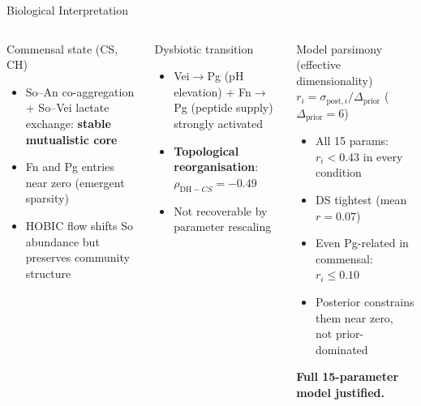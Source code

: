\documentclass[aspectratio=169,10pt]{beamer}
\begin{document}
\begin{frame}[t]{Biological Interpretation}
  \small
  \begin{columns}[T]
      \begin{block}{Commensal state (CS, CH)}
        \begin{itemize}
          \item So--An co-aggregation + So--Vei lactate exchange: \textbf{stable mutualistic core}
          \item Fn and Pg entries near zero (emergent sparsity)
          \item HOBIC flow shifts So abundance but preserves community structure
        \end{itemize}
      \end{block}
      \vspace{6pt}
      \begin{block}{Dysbiotic transition}
        \begin{itemize}
          \item Vei$\to$Pg (pH elevation) + Fn$\to$Pg (peptide supply) strongly activated
          \item \textbf{Topological reorganisation}: $\rho_{\mathrm{DH}-CS}=-0.49$
          \item Not recoverable by parameter rescaling
        \end{itemize}
      \end{block}
      \begin{block}{Model parsimony (effective dimensionality)}
        $r_i = \sigma_{{\mathrm{post}},i}/\Delta_{\mathrm{prior}}$ ($\Delta_{\mathrm{prior}}=6$)
        \vspace{4pt}
        \begin{itemize}
          \item All 15 params: $r_i < 0.43$ in every condition
          \item DS tightest (mean $r=0.07$)
          \item Even Pg-related in commensal: $r_i\leq0.10$
          \item[$\Rightarrow$] Posterior constrains them near zero,\\
                not prior-dominated
        \end{itemize}
        \vspace{4pt}
        \textcolor{ikm}{\textbf{Full 15-parameter model justified.}}
      \end{block}
  \end{columns}
\end{frame}
\end{document}
